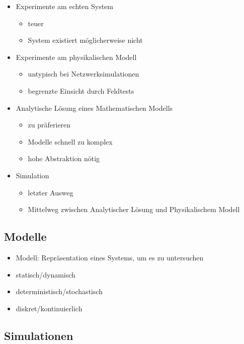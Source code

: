 \documentclass[nonacm=true, language=german]{acmart}
\begin{document}
\begin{itemize}
    \item Experimente am echten System
    \begin{itemize}
        \item teuer
        \item System existiert möglicherweise nicht
    \end{itemize}
    \item Experimente am physikalischen Modell
    \begin{itemize}
        \item untypisch bei Netzwerksimulationen
        \item begrenzte Einsicht durch Feldtests
    \end{itemize}
    \item Analytische Lösung eines Mathematischen Modells
    \begin{itemize}
        \item zu präferieren
        \item Modelle schnell zu komplex
        \item hohe Abstraktion nötig
    \end{itemize}
    \item Simulation
    \begin{itemize}
        \item letzter Ausweg
        \item Mittelweg zwischen Analytischer Lösung und Physikalischem Modell
    \end{itemize}
\end{itemize}

\subsection{Modelle}

\begin{itemize}
    \item Modell: Repräsentation eines Systems, um es zu untersuchen
    \item statisch/dynamisch
    \item deterministisch/stochastisch
    \item diskret/kontinuierlich
\end{itemize}

\subsection{Simulationen}
\end{document}
